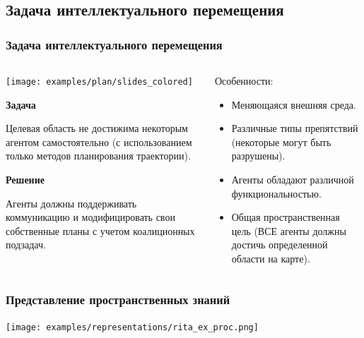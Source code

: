 \documentclass[default]{beamer}
\begin{document}
	\subsection{Задача интеллектуального перемещения}
	\begin{frame}
		\frametitle{Задача интеллектуального перемещения}
		
		\begin{columns}
			\begin{column}{0.55\textwidth}
				\begin{center}
					\texttt{[image: examples/plan/slides\_colored]}
				\end{center}
				\vspace{-7pt}
				\small
				\textbf{Задача}
				
				Целевая область не достижима некоторым агентом самостоятельно (с использованием только методов планирования траектории).
				
				\textbf{Решение}
				
				Агенты должны поддерживать коммуникацию и модифицировать свои собственные планы с учетом коалиционных подзадач.
				
			\end{column}
			\begin{column}{0.45\textwidth}
				Особенности:
				\begin{itemize}
					\item Меняющаяся внешняя среда.
					\item Различные типы препятствий (некоторые могут быть разрушены).
					\item Агенты обладают различной функциональностью.
					\item Общая пространственная цель (ВСЕ агенты должны достичь определенной области на карте).
				\end{itemize}
			\end{column}
		\end{columns}
	\end{frame}
	
	\begin{frame}
		\frametitle{Представление пространственных знаний}
		
		\texttt{[image: examples/representations/rita\_ex\_proc.png]}
		
		\nocite{*}
		\printbibliography[keyword={planknow}, resetnumbers=true]
	\end{frame}
\end{document}
